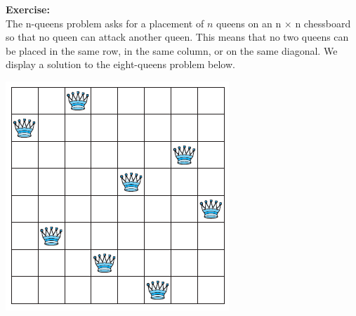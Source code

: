 \begin{tcolorbox}[title=Example 1: The n-Queens Problem (1/2)]
\textbf{Exercise:}  
\\ The n-queens problem asks for a placement of $n$ queens on an n × n
chessboard so that no queen can attack another queen. This means that no two queens can be
placed in the same row, in the same column, or on the same diagonal. We display a solution
to the eight-queens problem below.

\centering
\includegraphics[width=0.3\linewidth]{chp1_3_propequiv/n_queens.png}


\end{tcolorbox}
